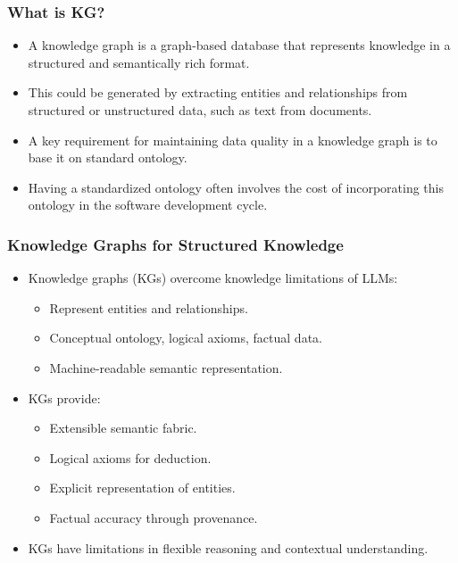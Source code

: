 \begin{frame}[fragile]\frametitle{What is KG?}

\begin{itemize}
\item A knowledge graph is a graph-based database that represents knowledge in a structured and semantically rich format. 
\item This could be generated by extracting entities and relationships from structured or unstructured data, such as text from documents. 
\item A key requirement for maintaining data quality in a knowledge graph is to base it on standard ontology. 
\item Having a standardized ontology often involves the cost of incorporating this ontology in the software development cycle.
\end{itemize}

\end{frame}

\begin{frame}[fragile]\frametitle{Knowledge Graphs for Structured Knowledge}
    \begin{itemize}
        \item Knowledge graphs (KGs) overcome knowledge limitations of LLMs:
        \begin{itemize}
            \item Represent entities and relationships.
            \item Conceptual ontology, logical axioms, factual data.
            \item Machine-readable semantic representation.
        \end{itemize}
        \item KGs provide:
        \begin{itemize}
            \item Extensible semantic fabric.
            \item Logical axioms for deduction.
            \item Explicit representation of entities.
            \item Factual accuracy through provenance.
        \end{itemize}
        \item KGs have limitations in flexible reasoning and contextual understanding.
    \end{itemize}
\end{frame}


